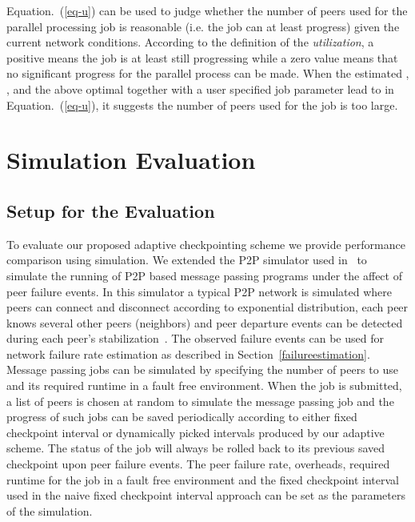 \documentclass[times, 12pt, onecolumn]{article}
\newcommand{\refeq}[1]{Equation.~(\ref{#1})}
\newcommand{\refsec}[1]{Section~\ref{#1}}
\begin{document}
\refeq{eq-u} can be used to judge whether the number of peers used
for the parallel processing job is reasonable (i.e. the job can at least
progress) given the current network conditions. According to the definition of
the \emph{utilization}, a positive  means the job is at least still
progressing while a zero value means that no significant progress for the parallel process
can be made. When the estimated , ,  and the above optimal
 together with a user specified job parameter  lead to  in
\refeq{eq-u}, it suggests the number of peers used for the job is too large. 














\section{Simulation Evaluation}
\subsection{Setup for the Evaluation}


To evaluate our proposed adaptive checkpointing scheme we provide performance comparison using simulation. 
We extended the P2P simulator used in~\cite{estimation} to simulate the running of P2P based message passing 
programs under the affect of peer failure events. In this simulator a typical P2P network is simulated where 
peers can connect and disconnect according to exponential distribution, each peer knows several other peers 
(neighbors) and peer departure events can be detected during each peer's stabilization~\cite{chord, mspastry}. 
The observed failure events can be used for network failure rate estimation as described in \refsec{failureestimation}. 
Message passing jobs can be simulated by specifying the number of peers to use and its required runtime in a 
fault free environment. When the job is submitted, a list of peers is chosen at random to simulate the 
message passing job and the progress of such jobs can be saved periodically according to either fixed checkpoint 
interval or dynamically picked intervals produced by our adaptive scheme. The status of the job will always be 
rolled back to its previous saved checkpoint upon peer failure events. The peer failure rate, overheads, required 
runtime for the job in a fault free environment and the fixed checkpoint interval used in the naive fixed 
checkpoint interval approach can be set as the parameters of the simulation. 
\end{document}
